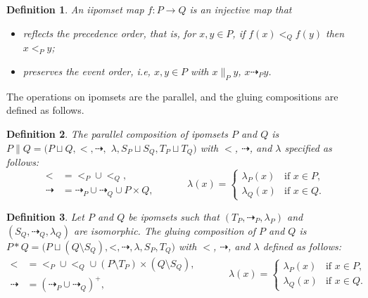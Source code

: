 \documentclass[11pt,a4paper,oldfontcommands]{memoir}
\newcommand*\intord{\dashrightarrow}
\newcommand*\para{\mathrel{\|}}
\newcommand*\incomp{\mathrel{\|}}
\newtheorem{definition}{Definition}
\begin{document}
\begin{definition}
An iipomset map $f:P \rightarrow Q$ is an injective map that
    \begin{itemize}
        \item  reflects the precedence order, that is, for $x, y\in P$, if $f( x)<_Q f( y)$ then $x<_P y$;
        \item preserves the event order, i.e, $x, y\in P$ with $x\incomp_P y$, $x\intord_P y$.
    \end{itemize}
\end{definition}
The operations on ipomsets are the parallel, and the gluing compositions are defined as follows.


\begin{definition}
  The \emph{parallel composition} of ipomsets $P$ and $Q$ is \linebreak
  $P\para Q=( P\sqcup Q, <, \intord,$  %
  $\lambda,S_P\sqcup S_Q, T_P\sqcup
  T_Q)$ with $<$, $\intord$, and $\lambda$ specified as
  follows:
  \begin{equation*}
    \begin{aligned}
      \mathord< &= \mathord{<_P}\cup \mathord{<_Q}, \\
      \mathord{\intord} &= \mathord{\intord_P}\cup
      \mathord{\intord_Q}\cup P\times Q,
    \end{aligned}
    \qquad\quad
    \lambda( x)=
    \begin{cases}
      \lambda_P( x) &\text{if } x\in P, \\
      \lambda_Q( x) &\text{if } x\in Q.
    \end{cases}
  \end{equation*}
  \end{definition}


\begin{definition}
  Let $P$ and $Q$ be ipomsets such that
  $( T_P, \mathord{\intord_P}, \lambda_P)$ and
  $( S_Q, \mathord{\intord_Q}, \lambda_Q)$ are isomorphic.  The \emph{gluing
    composition} of $P$ and $Q$ is
  $P* Q=( P\sqcup( Q\setminus S_Q), \mathord<, \mathord{\intord},
  \lambda,  $\linebreak $S_P,T_Q)$ with $<$, $\intord$, and $\lambda$ defined as
  follows:
  \begin{equation*}
    \begin{aligned}
      \mathord< &= \mathord{<_P}\cup \mathord{<_Q}\cup( P\setminus
      T_P)\times( Q\setminus S_Q), \\
      \mathord{\intord} &= ( \mathord{\intord_P}\cup
      \mathord{\intord_Q})^+,
    \end{aligned}
    \qquad\quad
    \lambda( x)=
    \begin{cases}
      \lambda_P( x) &\text{if } x\in P, \\
      \lambda_Q( x) &\text{if } x\in Q.
    \end{cases}
  \end{equation*}
\end{definition}
\end{document}
